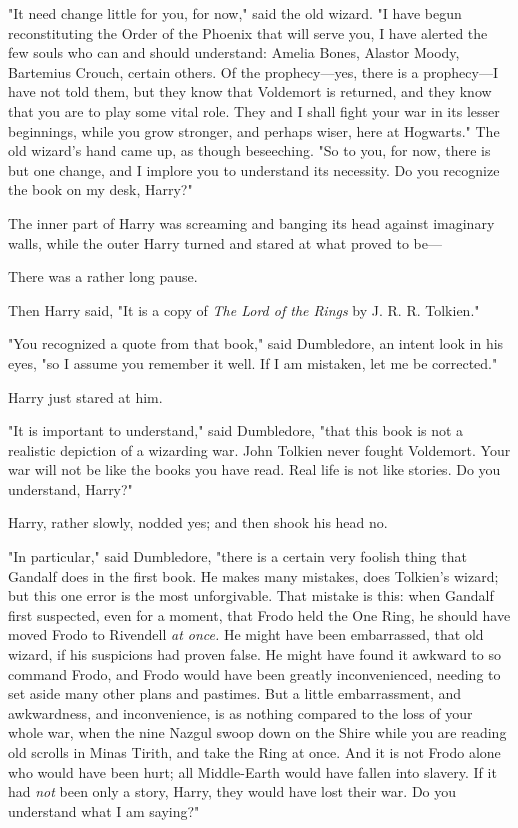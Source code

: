 "It need change little for you, for now," said the old wizard. "I have begun
reconstituting the Order of the Phoenix that will serve you, I have alerted the
few souls who can and should understand: Amelia Bones, Alastor Moody, Bartemius
Crouch, certain others. Of the prophecy---yes, there is a prophecy---I have not
told them, but they know that Voldemort is returned, and they know that you are
to play some vital role. They and I shall fight your war in its lesser
beginnings, while you grow stronger, and perhaps wiser, here at Hogwarts." The
old wizard's hand came up, as though beseeching. "So to you, for now, there is
but one change, and I implore you to understand its necessity. Do you recognize
the book on my desk, Harry?"

The inner part of Harry was screaming and banging its head against imaginary
walls, while the outer Harry turned and stared at what proved to be---

There was a rather long pause.

Then Harry said, "It is a copy of \emph{The Lord of the Rings} by J. R. R.
Tolkien."

"You recognized a quote from that book," said Dumbledore, an intent look in his
eyes, "so I assume you remember it well. If I am mistaken, let me be corrected."

Harry just stared at him.

"It is important to understand," said Dumbledore, "that this book is not a
realistic depiction of a wizarding war. John Tolkien never fought Voldemort.
Your war will not be like the books you have read. Real life is not like
stories. Do you understand, Harry?"

Harry, rather slowly, nodded yes; and then shook his head no.

"In particular," said Dumbledore, "there is a certain very foolish thing that
Gandalf does in the first book. He makes many mistakes, does Tolkien's wizard;
but this one error is the most unforgivable. That mistake is this: when Gandalf
first suspected, even for a moment, that Frodo held the One Ring, he should
have moved Frodo to Rivendell \emph{at once.} He might have been embarrassed,
that old wizard, if his suspicions had proven false. He might have found it
awkward to so command Frodo, and Frodo would have been greatly inconvenienced,
needing to set aside many other plans and pastimes. But a little embarrassment,
and awkwardness, and inconvenience, is as nothing compared to the loss of your
whole war, when the nine Nazgul swoop down on the Shire while you are reading
old scrolls in Minas Tirith, and take the Ring at once. And it is not Frodo
alone who would have been hurt; all Middle-Earth would have fallen into
slavery. If it had \emph{not} been only a story, Harry, they would have lost
their war. Do you understand what I am saying?"

